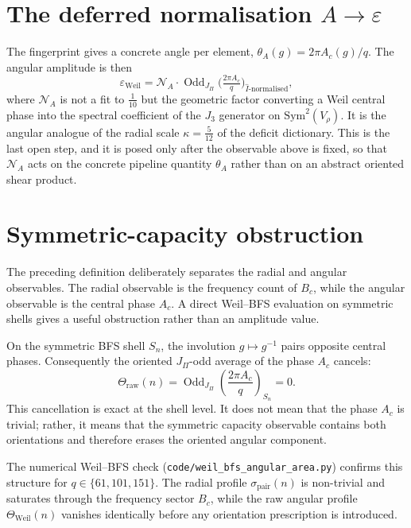 \documentclass[11pt]{article}
\providecommand{\Sym}{\mathrm{Sym}}
\providecommand{\Ihat}{\widehat{I}}
\begin{document}
  \section{The deferred normalisation $A \to \varepsilon$}

    The fingerprint gives a concrete angle per element, $\theta_A(g) = 2\pi A_c(g)/q$.
    The angular amplitude is then
    \[
      \varepsilon_{\mathrm{Weil}}
      = \mathcal{N}_A \cdot
      \operatorname{Odd}_{J_\Pi}\!\Big( \tfrac{2\pi A_c}{q} \Big)_{\Ihat\text{-normalised}} ,
    \]
    where $\mathcal{N}_A$ is not a fit to $\tfrac{1}{10}$ but the geometric factor converting a Weil central
    phase into the spectral coefficient of the $J_3$ generator on $\Sym^2(V_\rho)$.
    It is the angular analogue of the radial scale $\kappa = \tfrac{5}{12}$ of the deficit dictionary.
    This is the last open step, and it is posed only after the observable above is fixed, so that
    $\mathcal{N}_A$ acts on the concrete pipeline quantity $\theta_A$ rather than on an abstract oriented shear product.

  \section{Symmetric-capacity obstruction}
    \label{sec:sym-cap-obstruction}

    The preceding definition deliberately separates the radial and angular observables.
    The radial observable is the frequency count of $B_c$, while the angular observable is
    the central phase $A_c$.
    A direct Weil--BFS evaluation on symmetric shells gives a useful obstruction rather
    than an amplitude value.

    On the symmetric BFS shell $S_n$, the involution $g\mapsto g^{-1}$ pairs opposite
    central phases.
    Consequently the oriented $J_\Pi$-odd average of the phase $A_c$ cancels:
    \[
      \Theta_{\mathrm{raw}}(n)
      =
      \operatorname{Odd}_{J_\Pi}
      \left(
        \frac{2\pi A_c}{q}
      \right)_{S_n}
      =
      0 .
    \]
    This cancellation is exact at the shell level.
    It does not mean that the phase $A_c$ is trivial; rather, it means that the symmetric
    capacity observable contains both orientations and therefore erases the oriented
    angular component.

    The numerical Weil--BFS check (\texttt{code/weil\_bfs\_angular\_area.py}) confirms this structure for
    $q\in\{61,101,151\}$.
    The radial profile $\sigma_{\mathrm{pair}}(n)$ is non-trivial and saturates through the
    frequency sector $B_c$, while the raw angular profile
    $\Theta_{\mathrm{Weil}}(n)$ vanishes identically before any orientation prescription is
    introduced.
\end{document}
